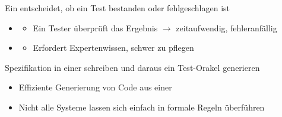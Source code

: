 \begin{infoBox}[title=Test Oracle Synthesis (Erstellung von Test-Orakeln)]
    Ein  entscheidet, ob ein Test bestanden oder fehlgeschlagen ist\\
    \begin{itemize}
        \item {}
        \begin{itemize}
            \item Ein Tester überprüft das Ergebnis $\rightarrow$ zeitaufwendig, fehleranfällig
        \end{itemize}
        \item {}
        \begin{itemize}
            \item Erfordert Expertenwissen, schwer zu pflegen
        \end{itemize}
    \end{itemize}
     Spezifikation in einer  schreiben und daraus ein Test-Orakel generieren\\
    \begin{itemize}
        \item Effiziente Generierung von Code aus einer 
        \item Nicht alle Systeme lassen sich einfach in formale Regeln überführen
    \end{itemize}
\end{infoBox}
